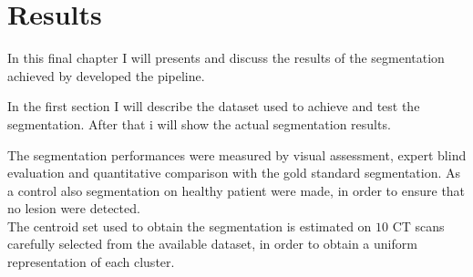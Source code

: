 \documentclass{standalone}
\begin{document}
	\chapter{Results}
	
	In this final chapter I will presents and discuss the results of the segmentation achieved by developed the pipeline.
	
	In the first section I will describe the dataset used to achieve and test the segmentation. After that i will show the actual segmentation results.
	
	The segmentation performances were measured by visual assessment, expert blind evaluation  and quantitative comparison with the gold standard segmentation. As a control also segmentation on healthy patient were made, in order to ensure that no lesion were detected.\\
	The centroid set used to obtain the segmentation is estimated on $10$ CT scans carefully selected from the available dataset, in order to obtain a uniform representation of each cluster.
\end{document}
